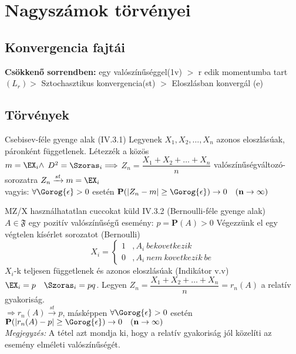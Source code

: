 \section{Nagyszámok törvényei}

\subsection{Konvergencia fajtái}

	\textbf{Csökkenő sorrendben:} egy valószínűséggel(1v) $>$ r edik momentumba tart $(L_r) >$ Sztochasztikus konvergencia(st) $>$ Eloszlásban konvergál (e)

\subsection{Törvények}
\begin{tetel}{Csebisev-féle gyenge alak (IV.3.1)}
		\forceindent Legyenek $X_1,X_2,\ldots,X_n$ azonos eloszlásúak, páronként függetlenek. Létezzék a közös\\[1pt] $m = \EX_i \land$  $D^2 = \Szoras_i \Longrightarrow$  $Z_n = \dfrac{X_1+X_2+\ldots+X_n}{n}$ valószínűségváltozó-sorozatra $Z_n \xrightarrow{st} m = \EX_i$\\[2pt]
		vagyis: $\forall \Gorog{\epsilon} > 0$ esetén $\textbf{P}(|Z_n-m| \geq \Gorog{\epsilon}) \rightarrow 0 \quad \mathbf{(n \rightarrow \infty )} $\\[3pt]
\end{tetel}
    \begin{tetel}{MZ/X használhatatlan cuccokat küld}
	IV.3.2 (Bernoulli-féle gyenge alak)\\[2pt]
	\forceindent $A \in \mathfrak{F}$ egy pozitív valószínűségű esemény: $p = \mathbf{P}(A) > 0$ Végezzünk el egy végtelen kísérlet sorozatot (Bernoulli)
	\[ X_i =  \begin{cases}
      1 & ,A_i\ bekovetkezik \\
      0 & ,A_i\ nem\ kovetkezik\ be
   \end{cases} \]
$X_i$-k teljesen függetlenek és azonos eloszlásúak (Indikátor v.v)\\[2pt]
$\EX_i = p \quad \Szoras_i = pq$. Legyen $Z_n = \dfrac{X_1+X_2+\ldots+X_n}{n} = r_n(A)$ a relatív gyakoriság.\\[2pt]
$\Longrightarrow r_n(A) \xrightarrow{st} p$,\quad
másképpen $\forall \Gorog{\epsilon} > 0$ esetén $\textbf{P}(|r_n(A)-p| \geq \Gorog{\epsilon}) \rightarrow 0 \quad \mathbf{(n \rightarrow \infty )}$\\[3pt]
\small \textit{Megjegyzés:} A tétel azt mondja ki, hogy a relatív gyakoriság jól közelíti az esemény elméleti valószínűségét. \normalsize \\[3pt]
\end{tetel}
